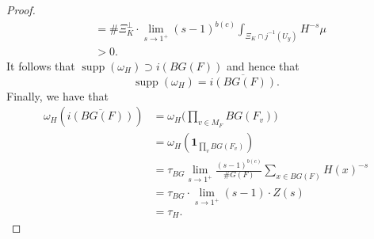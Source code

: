 \documentclass[a4paper,english,12pt]{amsart}
\newcommand{\RR}{\mathbb{R}}
\newcommand{\vMF}{v\in M_F}
\DeclareMathOperator{\supp}{supp}
\numberwithin{equation}{subsection}
\begin{document}
\begin{proof}
\begin{align*}
&=\#\Xi_K^{\perp}\cdot\lim_{s\to 1^+}(s-1)^{b(c)}\int_{\Xi_K\cap j^{-1}(U_y)}H^{-s}\mu\\
&>0.
\end{align*}
It follows that $\supp(\omega_H)\supset i(BG(F))$ and hence that $$\supp(\omega_H)=\overline{i(BG(F))}.$$
Finally, we have that \begin{align*}\omega_H(\overline{i(BG(F))})&=\omega_H\big(\prod_{\vMF}BG(F_v)\big)\\&=\omega_H(\mathbf{1}_{\prod_v BG(F_v)})\\&= \tau_{BG}\lim_{s\to 1^+}\frac{(s-1)^{b(c)}}{\# G(F)}\sum_{x\in BG(F)}H(x)^{-s}\\&=\tau_{BG}\cdot\lim_{s\to 1^+}(s-1)\cdot Z(s)\\&=\tau_H.
\end{align*} 

\end{proof}
\end{document}
